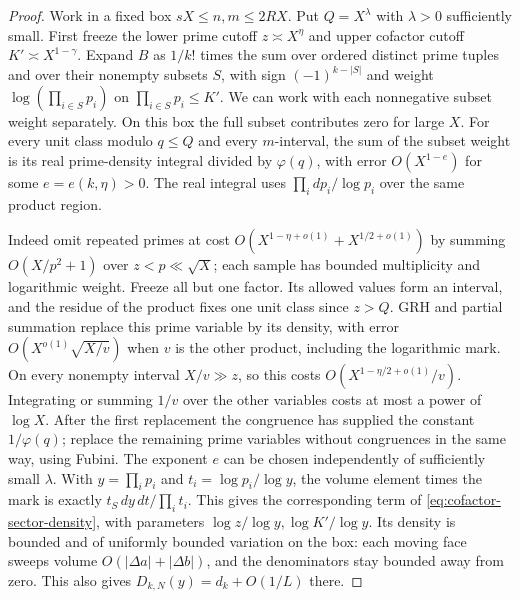 \documentclass[11pt,a4paper]{article}
\numberwithin{equation}{section}
\begin{document}
\begin{proof}
Work in a fixed box $sX\le n,m\le 2RX$. Put $Q=X^\lambda$
with $\lambda>0$ sufficiently small. First freeze the lower
prime cutoff $z\asymp X^\eta$ and upper cofactor cutoff
$K'\asymp X^{1-\gamma}$. Expand $B$ as $1/k!$ times the sum
over ordered distinct prime tuples and over their nonempty
subsets $S$, with sign $(-1)^{k-|S|}$ and weight
$\log(\prod_{i\in S}p_i)$ on $\prod_{i\in S}p_i\le K'$.
We can work with each nonnegative subset weight separately.
On this box the full subset contributes zero for large $X$.
For every unit class modulo $q\le Q$ and every $m$-interval,
the sum of the subset weight is its real prime-density integral
divided by $\varphi(q)$, with error $O(X^{1-e})$ for some
$e=e(k,\eta)>0$. The real integral uses $\prod_i dp_i/\log p_i$
over the same product region.

Indeed omit repeated primes at cost $O(X^{1-\eta+o(1)}+
X^{1/2+o(1)})$ by summing $O(X/p^2+1)$ over $z<p\ll\sqrt X$;
each sample has bounded multiplicity and logarithmic weight.
Freeze all but one factor. Its allowed values form an interval,
and the residue of the product fixes one unit class since
$z>Q$. GRH and partial summation replace this prime variable
by its density, with error $O(X^{o(1)}\sqrt{X/v})$ when
$v$ is the other product, including the logarithmic mark.
On every nonempty interval $X/v\gg z$, so this costs
$O(X^{1-\eta/2+o(1)}/v)$. Integrating or summing $1/v$
over the other variables costs at most a power of $\log X$.
After the first replacement the congruence has supplied the
constant $1/\varphi(q)$; replace the remaining prime variables
without congruences in the same way, using Fubini. The exponent
$e$ can be chosen independently of sufficiently small $\lambda$.
With $y=\prod_i p_i$ and $t_i=\log p_i/\log y$, the volume
element times the mark is exactly
$t_S\,dy\,dt/\prod_i t_i$. This gives the corresponding
term of \eqref{eq:cofactor-sector-density}, with parameters
$\log z/\log y,\log K'/\log y$. Its density is bounded and of
uniformly bounded variation on the box: each moving face sweeps
volume $O(|\Delta a|+|\Delta b|)$, and the denominators stay
bounded away from zero. This also gives
$D_{k,N}(y)=d_k+O(1/L)$ there.


\end{proof}
\end{document}
